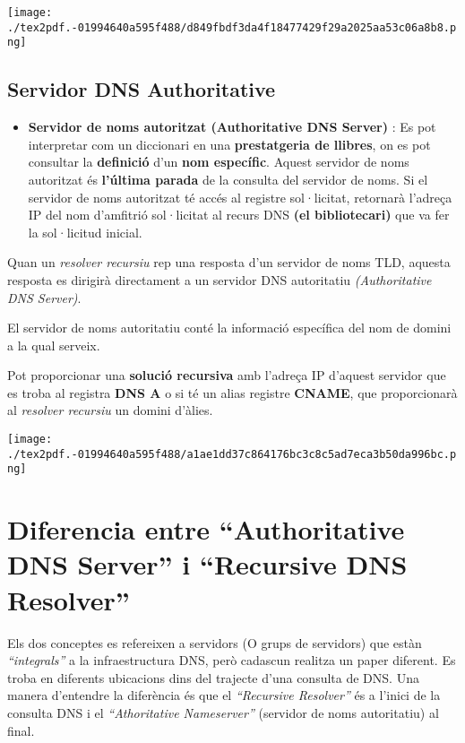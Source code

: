 \documentclass[]{article}
\providecommand{\tightlist}{%
  \setlength{\itemsep}{0pt}\setlength{\parskip}{0pt}}
\begin{document}
\texttt{[image: ./tex2pdf.-01994640a595f488/d849fbdf3da4f18477429f29a2025aa53c06a8b8.png]}

\hypertarget{servidor-dns-authoritative}{%
\subsection{\texorpdfstring{\textbf{Servidor DNS
Authoritative}}{Servidor DNS Authoritative}}\label{servidor-dns-authoritative}}

\begin{itemize}
\tightlist
\item
  \textbf{Servidor de noms autoritzat (Authoritative DNS Server)} : Es
  pot interpretar com un diccionari en una \textbf{prestatgeria de
  llibres}, on es pot consultar la \textbf{definició} d'un \textbf{nom
  específic}. Aquest servidor de noms autoritzat és \textbf{l'última
  parada} de la consulta del servidor de noms. Si el servidor de noms
  autoritzat té accés al registre sol·licitat, retornarà l'adreça IP del
  nom d'amfitrió sol·licitat al recurs DNS \textbf{(el bibliotecari)}
  que va fer la sol·licitud inicial.
\end{itemize}

Quan un \emph{resolver recursiu} rep una resposta d'un servidor de noms
TLD, aquesta resposta es dirigirà directament a un servidor DNS
autoritatiu \emph{(Authoritative DNS Server)}.

El servidor de noms autoritatiu conté la informació específica del nom
de domini a la qual serveix.

Pot proporcionar una \textbf{solució recursiva} amb l'adreça IP d'aquest
servidor que es troba al registra \textbf{DNS A} o si té un alias
registre \textbf{CNAME}, que proporcionarà al \emph{resolver recursiu}
un domini d'àlies.

\texttt{[image: ./tex2pdf.-01994640a595f488/a1ae1dd37c864176bc3c8c5ad7eca3b50da996bc.png]}

\hypertarget{diferencia-entre-authoritative-dns-server-i-recursive-dns-resolver}{%
\section{\texorpdfstring{\textbf{Diferencia entre ``Authoritative DNS
Server'' i ``Recursive DNS
Resolver''}}{Diferencia entre ``Authoritative DNS Server'' i ``Recursive DNS Resolver''}}\label{diferencia-entre-authoritative-dns-server-i-recursive-dns-resolver}}

Els dos conceptes es refereixen a servidors (O grups de servidors) que
estàn \emph{``integrals''} a la infraestructura DNS, però cadascun
realitza un paper diferent. Es troba en diferents ubicacions dins del
trajecte d'una consulta de DNS. Una manera d'entendre la diferència és
que el \emph{``Recursive Resolver''} és a l'inici de la consulta DNS i
el \emph{``Athoritative Nameserver''} (servidor de noms autoritatiu) al
final.
\end{document}
